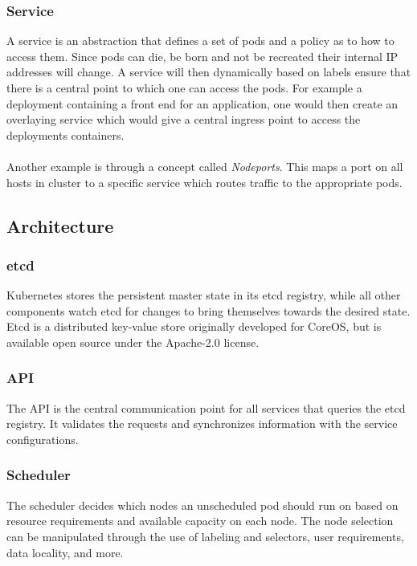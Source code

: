 \documentclass[../main.tex]{subfiles}
\begin{document}
\subsubsection*{Service}
A service is an abstraction that defines a set of pods and a policy as to how to access them. Since pods can die, be born and not be recreated their internal IP addresses will change. A service will then dynamically based on labels ensure that there is a central point to which one can access the pods. \cite{kubernetes_services} For example a deployment containing a front end for an application, one would then create an overlaying service which would give a central ingress point to access the deployments containers.\\\\
Another example is through a concept called \textit{Nodeports}. This maps a port on all hosts in cluster to a specific service which routes traffic to the appropriate pods.


\subsection{Architecture}
\subsubsection*{etcd}
Kubernetes stores the persistent master state in its etcd registry, while all other components watch etcd for changes to bring themselves towards the desired state. Etcd is a distributed key-value store originally developed for CoreOS, but is available open source under the Apache-2.0 license. \cite{openshift_infrastructure, github_etcd}

\subsubsection*{API}
The API is the central communication point for all services that queries the etcd registry. It validates the requests and synchronizes information with the service configurations. \cite{openshift_infrastructure}

\subsubsection*{Scheduler}
The scheduler decides which nodes an unscheduled pod should run on based on resource requirements and available capacity on each node. The node selection can be manipulated through the use of labeling and selectors, user requirements, data locality, and more. \cite{kubernetes_component_overview}
\end{document}
